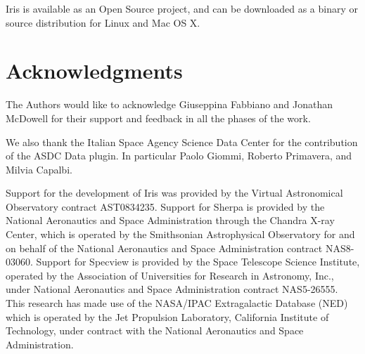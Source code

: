 \documentclass[final,5p,authoryear]{elsarticle}
\begin{document}
Iris is available as an Open Source project, and can be downloaded as a binary
or source distribution for Linux and Mac OS X.


\section*{Acknowledgments}
The Authors would like to acknowledge Giuseppina Fabbiano and Jonathan McDowell
for their support and feedback in all the phases of the work.

We also thank the Italian Space Agency Science Data Center for the contribution
of the ASDC Data plugin. In particular Paolo Giommi, Roberto Primavera, and
Milvia Capalbi.

Support for the development of Iris was provided by
the Virtual Astronomical Observatory contract AST0834235. Support for Sherpa is
provided by the National Aeronautics and Space Administration through the
Chandra X-ray Center, which is operated by the Smithsonian Astrophysical
Observatory for and on behalf of the National Aeronautics and Space
Administration contract NAS8-03060.  Support for Specview is provided by the
Space Telescope Science Institute, operated by the Association of Universities
for Research in Astronomy, Inc., under National Aeronautics and Space
Administration contract NAS5-26555. This research has made use of the NASA/IPAC
Extragalactic Database (NED) which is operated by the Jet Propulsion Laboratory,
California Institute of Technology, under contract with the National Aeronautics
and Space Administration.


\end{document}
